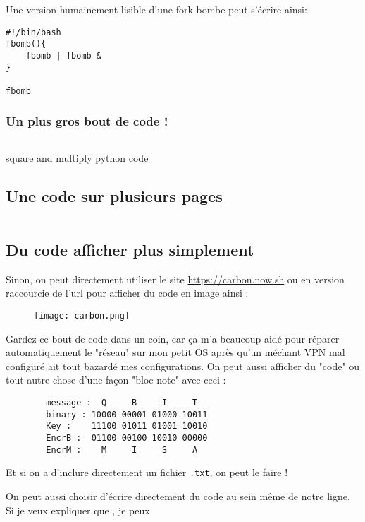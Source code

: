 Une version humainement lisible d'une fork bombe peut s'écrire ainsi:
\begin{verbatim}
#!/bin/bash
fbomb(){
    fbomb | fbomb &
}

fbomb
\end{verbatim}

\subsubsection{Un plus gros bout de code !}
\begin{listing}[H]
    \inputminted{python}{src/parts/code/example.py}
    \caption{square and multiply python code}
    \label{cd:square_and_mult}
\end{listing}

\subsection{Une code sur plusieurs pages}

\inputminted{python}{src/parts/code/example2.py}


\subsection{Du code afficher plus simplement}

Sinon, on peut directement utiliser le site \url{https://carbon.now.sh} ou en version raccourcie de l'url  pour afficher du code en image ainsi :
\begin{figure}[H]
    \centering
    \texttt{[image: carbon.png]}
\end{figure}

Gardez ce bout de code dans un coin, car ça m'a beaucoup aidé pour réparer automatiquement le
"réseau" sur mon petit OS après qu'un méchant VPN mal configuré ait tout bazardé mes
configurations.
\ideaEnd
On peut aussi afficher du "code" ou tout autre chose d'une façon "bloc note" avec ceci :
\begin{mycodebox}
    \begin{verbatim}
        message :  Q     B     I     T
        binary : 10000 00001 01000 10011
        Key :    11100 01011 01001 10010
        EncrB :  01100 00100 10010 00000
        EncrM :    M     I     S     A
    \end{verbatim}
\end{mycodebox}

Et si on a  d'inclure directement un fichier \texttt{.txt}, on peut le faire !


On peut aussi choisir d'écrire directement du code au sein même de notre ligne. Si je veux expliquer que
, je peux.

